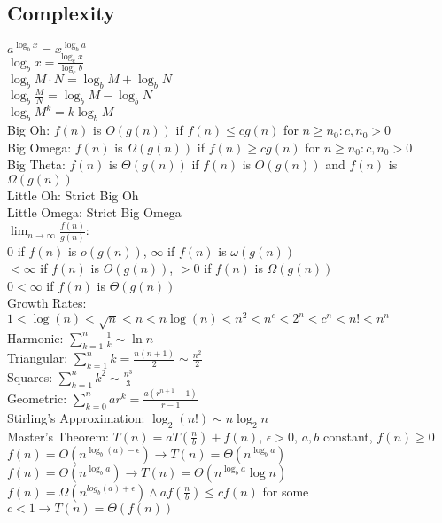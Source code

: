 \documentclass{article}
\begin{document}
\begin{multicols*}{2}
        \subsection*{Complexity}
        $a^{\log_b x} = x^{\log_b a}$\\
        $\log_b x = \frac{\log_c x}{\log_c b}$\\
        $\log_b M \cdot N = \log_b M + \log_b N$\\
        $\log_b \frac{M}{N} = \log_b M - \log_b N$\\
        $\log_b M^k = k\log_b M$\\
        Big Oh: $f(n)$ is $O(g(n))$ if $f(n) \leq cg(n)$ for $n \geq n_0 : c, n_0 > 0$\\
        Big Omega: $f(n)$ is $\Omega(g(n))$ if $f(n) \geq cg(n)$ for $n \geq n_0 : c, n_0 > 0$\\
        Big Theta: $f(n)$ is $\Theta(g(n))$ if $f(n)$ is $O(g(n))$ and $f(n)$ is $\Omega(g(n))$\\
        Little Oh: Strict Big Oh\\
        Little Omega: Strict Big Omega\\
        $\lim_{n\to\infty}\frac{f(n)}{g(n)}$:\\
        0 if $f(n)$ is $o(g(n))$, $\infty$ if $f(n)$ is $\omega(g(n))$\\
        $< \infty$ if $f(n)$ is $O(g(n))$, $> 0$ if $f(n)$ is $\Omega(g(n))$\\
        $0 < \infty$ if $f(n)$ is $\Theta(g(n))$\\
        Growth Rates: $1 < \log(n) < \sqrt{n} < n < n\log(n) < n^2 < n^c < 2^n < c^n < n! < n^n$\\
        Harmonic: $\sum_{k=1}^{n} \frac{1}{k} \sim \ln n$\\
        Triangular: $\sum_{k=1}^{n} k = \frac{n(n + 1)}{2} \sim \frac{n^2}{2}$\\
        Squares: $\sum_{k=1}^{n} k^2 \sim \frac{n^3}{3}$\\
        Geometric: $\sum_{k=0}^{n} ar^k = \frac{a(r^{n+1} - 1)}{r - 1}$\\
        Stirling's Approximation: $\log_2(n!) \sim n\log_2 n$\\
        Master's Theorem: $T(n) = aT(\frac{n}{b}) + f(n)$, $\epsilon > 0$, $a,b$ constant, $f(n
        ) \geq 0$\\
        $f(n) = O(n^{\log_b (a) - \epsilon}) \to T(n) = \Theta(n^{\log_b a})$\\
        $f(n) = \Theta(n^{\log_b a}) \to T(n) = \Theta(n^{\log_b a}\log n)$\\
        $f(n) = \Omega(n^{log_b (a) + \epsilon}) \wedge af(\frac{n}{b}) \leq cf(n)$ for some $c
        < 1 \to T(n) = \Theta(f(n))$

\end{multicols*}
\end{document}
